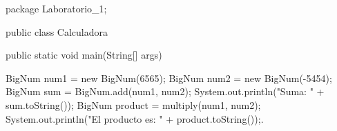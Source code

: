 package Laboratorio_1;

public class Calculadora {
    public static void main(String[] args) {
        BigNum num1 = new BigNum(6565);
            BigNum num2 = new BigNum(-5454);
            BigNum sum = BigNum.add(num1, num2);
            System.out.println("Suma: " + sum.toString());
            BigNum product = multiply(num1, num2);
            System.out.println("El producto es: " + product.toString());.
            
    }
}

